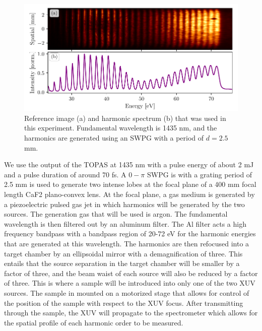\begin{figure}
	\centering
	\includegraphics[width=1.0\textwidth]{figures/refractive_index/reference_img_spectrum.pdf}
	\caption[Reference image and spectrum of harmonics used to measure refractive index using SWPG]{Reference image (a) and harmonic spectrum (b) that was used in this experiment.  Fundamental wavelength is 1435 nm, and the harmonics are generated using an SWPG with a period of $d=2.5$ mm.}
	\label{fig:ref_img_spec}
\end{figure}
We use the output of the TOPAS at 1435 nm with a pulse energy of about 2 mJ and a pulse duration of around 70 fs. A $0-\pi$ SWPG is with a grating period of 2.5 mm is used to generate two intense lobes at the focal plane of a 400 mm focal length CaF2 plano-convex lens. At the focal plane, a gas medium is generated by a piezoelectric pulsed gas jet in which harmonics will be generated by the two sources.  The generation gas that will be used is argon. The fundamental wavelength is then filtered out by an aluminum filter.  The Al filter acts a high frequency bandpass with a bandpass region of 20-72 eV for the harmonic energies that are generated at this wavelength.  The harmonics are then refocused into a target chamber by an ellipsoidal mirror with a demagnification of three.  This entails that the source separation in the target chamber will be smaller by a factor of three, and the beam waist of each source will also be reduced by a factor of three.  This is where a sample will be introduced into only one of the two XUV sources. The sample in mounted on a motorized stage that allows for control of the position of the sample with respect to the XUV focus. After transmitting through the sample, the XUV will propagate to the spectrometer which allows for the spatial profile of each harmonic order to be measured.

